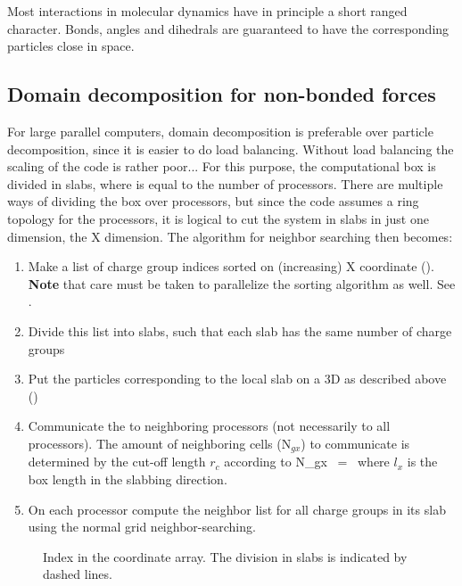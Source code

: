 Most interactions in molecular dynamics have in principle a short ranged character.
Bonds, angles and dihedrals are guaranteed to have the corresponding particles 
close in space.


\subsection{Domain decomposition for non-bonded forces}
For large parallel computers, domain decomposition is preferable over particle
decomposition, since it is easier to do load balancing. Without load balancing
the scaling of the code is rather poor...
For this purpose, the computational box is divided in {\nproc} slabs, where {\nproc}
is equal to the number of processors. There are multiple ways of dividing the box
over processors, but since the {\gromacs} code assumes
a ring topology for the processors, it is logical to cut the system in slabs in
just one dimension, the X dimension. 
The algorithm for neighbor searching then becomes:
\begin{enumerate}
\item	Make a list of charge group indices sorted on (increasing) X coordinate
	().
	{\bf Note} that care must be taken to parallelize the sorting algorithm
	as well. See .
\item	Divide this list into slabs, such that each slab has the same number of
	charge groups
\item	Put the particles corresponding to the local slab on a 3D {\nsgrid} as 
	described above ()
\item	Communicate the {\nsgrid} to neighboring processors (not necessarily to all
	processors). The amount of neighboring {\nsgrid} cells (N$_{gx}$) to 
	communicate is determined by the cut-off length $r_c$ according to
	\beq
	N_{gx}	~=~	   
	\eeq
	where $l_x$ is the box length in the slabbing direction. 
\item	On each processor compute the neighbor list for all charge groups in
	its slab using the normal grid neighbor-searching.
\end{enumerate}

\begin{figure}
\centerline{}
\caption[Index in the coordinate array.]{Index in the coordinate
array. The division in slabs is indicated by dashed lines.}
\label{fig:parsort}
\end{figure}

